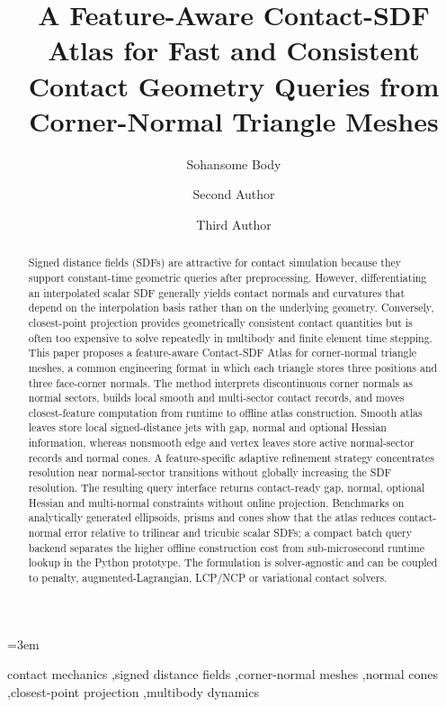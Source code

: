 \documentclass[preprint,12pt,sort&compress]{elsarticle}
\begin{document}
\emergencystretch=3em

\begin{frontmatter}

\title{A Feature-Aware Contact-SDF Atlas for Fast and Consistent Contact Geometry Queries from Corner-Normal Triangle Meshes}

\author[inst1]{Sohansome Body}
\author[inst1]{Second Author}
\author[inst2]{Third Author}

\address[inst1]{Department of Mechanical Engineering, Institution, City, Country}
\address[inst2]{Department of Computational Mechanics, Institution, City, Country}

\begin{abstract}
Signed distance fields (SDFs) are attractive for contact simulation because they support constant-time geometric queries after preprocessing. However, differentiating an interpolated scalar SDF generally yields contact normals and curvatures that depend on the interpolation basis rather than on the underlying geometry. Conversely, closest-point projection provides geometrically consistent contact quantities but is often too expensive to solve repeatedly in multibody and finite element time stepping. This paper proposes a feature-aware Contact-SDF Atlas for corner-normal triangle meshes, a common engineering format in which each triangle stores three positions and three face-corner normals. The method interprets discontinuous corner normals as normal sectors, builds local smooth and multi-sector contact records, and moves closest-feature computation from runtime to offline atlas construction. Smooth atlas leaves store local signed-distance jets with gap, normal and optional Hessian information, whereas nonsmooth edge and vertex leaves store active normal-sector records and normal cones. A feature-specific adaptive refinement strategy concentrates resolution near normal-sector transitions without globally increasing the SDF resolution. The resulting query interface returns contact-ready gap, normal, optional Hessian and multi-normal constraints without online projection. Benchmarks on analytically generated ellipsoids, prisms and cones show that the atlas reduces contact-normal error relative to trilinear and tricubic scalar SDFs; a compact batch query backend separates the higher offline construction cost from sub-microsecond runtime lookup in the Python prototype. The formulation is solver-agnostic and can be coupled to penalty, augmented-Lagrangian, LCP/NCP or variational contact solvers.
\end{abstract}

\begin{keyword}
contact mechanics \sep signed distance fields \sep corner-normal meshes \sep normal cones \sep closest-point projection \sep multibody dynamics
\end{keyword}

\end{frontmatter}
\end{document}
